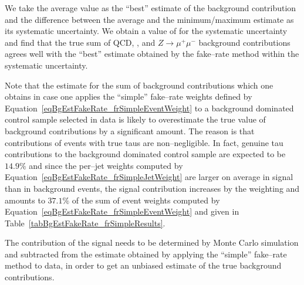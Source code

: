 We take the average value as the ``best'' estimate of the background contribution
and the difference between the average and the minimum/maximum estimate as its
systematic uncertainty.  We obtain a value of 
for the systematic uncertainty and find that the true sum of QCD, \WpJets,
\ttbarpJets and $Z \rightarrow \mu^{+} \mu^{-}$ background contributions
agrees well with the ``best'' estimate obtained by the fake--rate method within
the systematic uncertainty.

Note that the estimate for the sum of background contributions which one obtains
in case one applies the ``simple'' fake--rate weights defined by
Equation~\ref{eqBgEstFakeRate_frSimpleEventWeight} to a background dominated
control sample selected in data is likely to overestimate the true value of
background contributions by a significant amount.  The reason is that
contributions of \ZTT events with true taus are non--negligible.  In fact,
genuine tau contributions to the background dominated control sample are
expected to be $14.9 \%$ and since the per--jet weights computed by
Equation~\ref{eqBgEstFakeRate_frSimpleJetWeight} are larger on average in signal
than in background events, the signal contribution increases by the weighting
and amounts to $37.1 \%$ of the sum of event weights computed by
Equation~\ref{eqBgEstFakeRate_frSimpleEventWeight} and given in
Table~\ref{tabBgEstFakeRate_frSimpleResults}.

The contribution of the \ZTT signal needs to be
determined by Monte Carlo simulation and subtracted from the estimate obtained
by applying the ``simple'' fake--rate method to data, in order to get an
unbiased estimate of the true background contributions.

